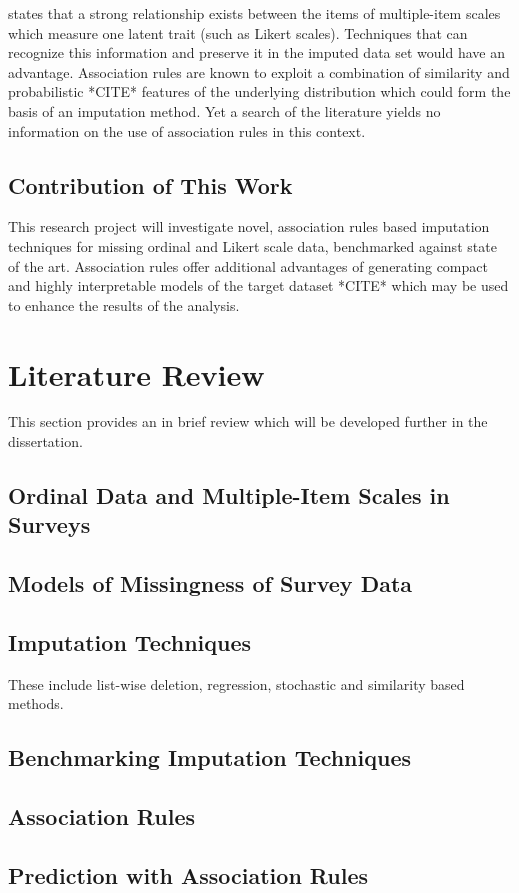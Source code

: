 \documentclass[a4paper]{article}\usepackage{knitr}
\begin{document}
\cite{huisman1999missing} states that a strong relationship exists between the items of multiple-item scales which measure one latent trait (such as Likert scales). Techniques that can recognize this information and preserve it in the imputed data set would have an advantage. Association rules are known to exploit a combination of similarity and probabilistic *CITE* features of the underlying distribution which could form the basis of an imputation method. Yet a search of the literature yields no information on the use of association rules in this context.\newline

\subsection{Contribution of This Work}

This research project will investigate novel, association rules based imputation techniques for missing ordinal and Likert scale data, benchmarked against state of the art. Association rules offer additional advantages of generating compact and highly interpretable models of the target dataset *CITE* which may be used to enhance the results of the analysis.

\section{Literature Review}

This section provides an in brief review which will be developed further in the dissertation.

\subsection{Ordinal Data and Multiple-Item Scales in Surveys}

\subsection{Models of Missingness of Survey Data}

\subsection{Imputation Techniques}

These include list-wise deletion, regression, stochastic and similarity based methods.

\subsection{Benchmarking Imputation Techniques}

\subsection{Association Rules}

\subsection{Prediction with Association Rules}

\printbibliography
\end{document}
